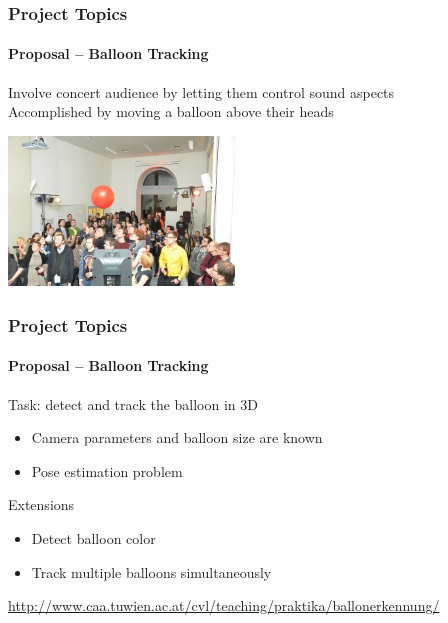 \documentclass[xetex,professionalfont]{beamer}
\begin{document}

\begin{frame}
\frametitle{Project Topics}
\framesubtitle{Proposal -- Balloon Tracking}

Involve concert audience by letting them control sound aspects\\\medskip
Accomplished by moving a balloon above their heads

\bigskip
\begin{center}
	\includegraphics[width=6cm]{figures/balloon.jpg}
\end{center}

\end{frame}


\begin{frame}
\frametitle{Project Topics}
\framesubtitle{Proposal -- Balloon Tracking}

Task: detect and track the balloon in 3D
\begin{itemize}
	\item Camera parameters and balloon size are known
	\item Pose estimation problem
\end{itemize}

\bigskip
Extensions
\begin{itemize}
	\item Detect balloon color
	\item Track multiple balloons simultaneously
\end{itemize}

\medskip
\begin{center}
	\small\url{http://www.caa.tuwien.ac.at/cvl/teaching/praktika/ballonerkennung/}
\end{center}

\end{frame}

\end{document}
